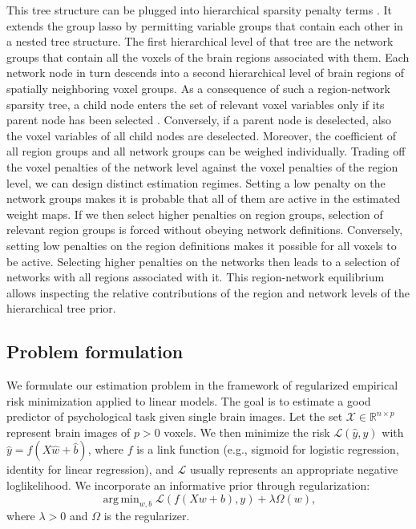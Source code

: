 \documentclass{article}
\DeclareMathOperator*{\argmin}{arg\,min}
\newcommand{\R}{\mathbb{R}}
\begin{document}
This tree structure can be plugged into
hierarchical sparsity penalty terms
\cite{jenatton2012multi}.
It extends the group lasso
\cite{yuan2006model}
by permitting variable groups that contain each other
in a nested tree structure.
The first hierarchical level of that tree are
the network groups that contain all
the voxels of the brain regions associated with them.
Each network node in turn descends into a second hierarchical level of
brain regions of spatially neighboring voxel groups.
%
As a consequence of such a region-network sparsity tree,
a child node enters the set of relevant voxel variables only
if its parent node has been selected
\cite{bach2012optimization}.
Conversely,
if a parent node is deselected,
also the voxel variables of all child nodes are deselected.
%
Moreover,
the coefficient of all region groups and all network groups can
be weighed individually.
Trading off the voxel penalties of the network level against the
voxel penalties of the region level,
we can design distinct estimation regimes.
%
Setting a low penalty on the network groups makes it is probable
that all of them are active in the estimated weight maps. If we then select
higher penalties on region groups, selection of relevant region groups is
forced without obeying network definitions.
Conversely, setting low penalties on the region definitions
makes it possible for
all voxels to be active. Selecting higher penalties on the networks then
leads to a selection of networks with all regions associated with it.
%
This region-network equilibrium allows inspecting the relative contributions
of the region and network levels
of the hierarchical tree prior.


\subsection{Problem formulation}
We formulate our estimation problem in the framework of regularized
empirical risk
minimization applied to linear models.
The goal is to estimate a good predictor of psychological task
given single brain images. Let the set \(\mathcal X\in\R^{n \times p}\) represent brain
images of \(p > 0\) voxels.
%
We then minimize the risk \(\mathcal L(\hat y, y)\) with
\(\hat y = f(X\hat w + \hat b)\), where \(f\) is a link function 
(e.g., sigmoid for logistic regression, identity for linear regression),
and \(\mathcal L\) usually represents an appropriate negative loglikelihood.
We incorporate an informative prior through regularization:
\[\argmin_{w, b} \mathcal L(f(Xw + b), y) + \lambda\Omega(w),\]
where \(\lambda > 0\) and \(\Omega\) is the regularizer.
\end{document}
